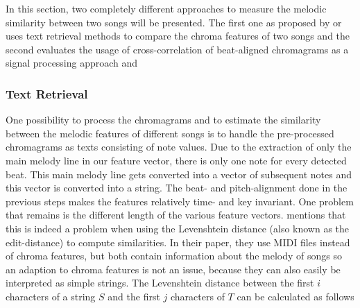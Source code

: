 In this section, two completely different approaches to measure the melodic similarity between two songs will be presented. The first one as proposed by \cite{chroma1} or \cite{chroma4} uses text retrieval methods to compare the chroma features of two songs and the second evaluates the usage of cross-correlation of beat-aligned chromagrams as a signal processing approach \cite{chroma2} and \cite{chroma3}

\subsubsection{Text Retrieval}\label{textretr}

One possibility to process the chromagrams and to estimate the similarity between the melodic features of different songs is to handle the pre-processed chromagrams as texts consisting of note values. Due to the extraction of only the main melody line in our feature vector, there is only one note for every detected beat. This main melody line gets converted into a vector of subsequent notes and this vector is converted into a string. The beat- and pitch-alignment done in the previous steps makes the features relatively time- and key invariant. One problem that remains is the different length of the various feature vectors. \cite{chroma4} mentions that this is indeed a problem when using the Levenshtein distance (also known as the edit-distance) to compute similarities. In their paper, they use MIDI files instead of chroma features, but both contain information about the melody of songs so an adaption to chroma features is not an issue, because they can also easily be interpreted as simple strings. The Levenshtein distance between the first $i$ characters of a string $S$ and the first $j$ characters of $T$ can be calculated as follows \cite[p. 7]{chroma4}

